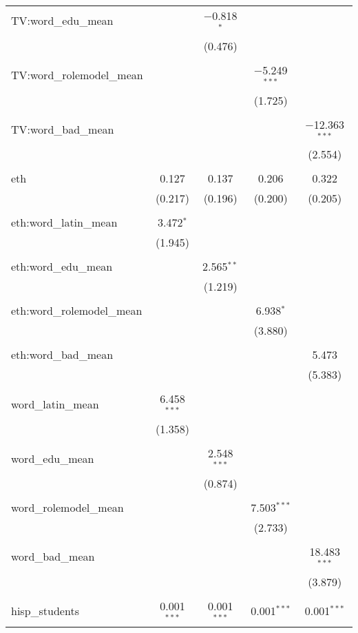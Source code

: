 \begin{table}[!htbp]
\begin{tabular}{@{\extracolsep{-2pt}}lcccc}
 TV:word\_edu\_mean &  & $-$0.818$^{*}$ &  &  \\ 
  &  & (0.476) &  &  \\ 
  & & & & \\ 
 TV:word\_rolemodel\_mean &  &  & $-$5.249$^{***}$ &  \\ 
  &  &  & (1.725) &  \\ 
  & & & & \\ 
 TV:word\_bad\_mean &  &  &  & $-$12.363$^{***}$ \\ 
  &  &  &  & (2.554) \\ 
  & & & & \\ 
 eth & 0.127 & 0.137 & 0.206 & 0.322 \\ 
  & (0.217) & (0.196) & (0.200) & (0.205) \\ 
  & & & & \\ 
 eth:word\_latin\_mean & 3.472$^{*}$ &  &  &  \\ 
  & (1.945) &  &  &  \\ 
  & & & & \\ 
 eth:word\_edu\_mean &  & 2.565$^{**}$ &  &  \\ 
  &  & (1.219) &  &  \\ 
  & & & & \\ 
 eth:word\_rolemodel\_mean &  &  & 6.938$^{*}$ &  \\ 
  &  &  & (3.880) &  \\ 
  & & & & \\ 
 eth:word\_bad\_mean &  &  &  & 5.473 \\ 
  &  &  &  & (5.383) \\ 
  & & & & \\ 
 word\_latin\_mean & 6.458$^{***}$ &  &  &  \\ 
  & (1.358) &  &  &  \\ 
  & & & & \\ 
 word\_edu\_mean &  & 2.548$^{***}$ &  &  \\ 
  &  & (0.874) &  &  \\ 
  & & & & \\ 
 word\_rolemodel\_mean &  &  & 7.503$^{***}$ &  \\ 
  &  &  & (2.733) &  \\ 
  & & & & \\ 
 word\_bad\_mean &  &  &  & 18.483$^{***}$ \\ 
  &  &  &  & (3.879) \\ 
  & & & & \\ 
 hisp\_students & 0.001$^{***}$ & 0.001$^{***}$ & 0.001$^{***}$ & 0.001$^{***}$ \\ 

\end{tabular}
\end{table}
